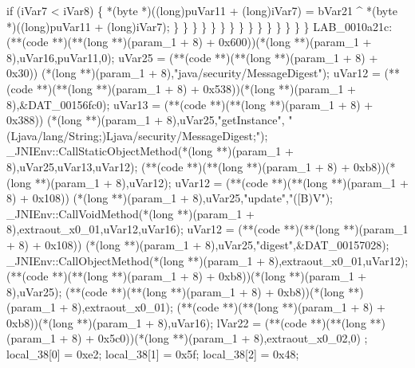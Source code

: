 \documentclass[
]{article}
\newenvironment{Shaded}{}{}
\newcommand{\NormalTok}[1]{#1}
\begin{document}
\begin{Shaded}
\begin{Highlighting}[]
\NormalTok{                              if (iVar7 \textless{} iVar8) \{}
\NormalTok{                                *(byte *)((long)puVar11 + (long)iVar7) =}
\NormalTok{                                     bVar21 \^{} *(byte *)((long)puVar11 + (long)iVar7);}
\NormalTok{                              \}}
\NormalTok{                            \}}
\NormalTok{                          \}}
\NormalTok{                        \}}
\NormalTok{                      \}}
\NormalTok{                    \}}
\NormalTok{                  \}}
\NormalTok{                \}}
\NormalTok{              \}}
\NormalTok{            \}}
\NormalTok{          \}}
\NormalTok{        \}}
\NormalTok{      \}}
\NormalTok{    \}}
\NormalTok{  \}}
\NormalTok{LAB\_0010a21c:}
\NormalTok{  (**(code **)(**(long **)(param\_1 + 8) + 0x600))(*(long **)(param\_1 + 8),uVar16,puVar11,0);}
\NormalTok{  uVar25 = (**(code **)(**(long **)(param\_1 + 8) + 0x30))}
\NormalTok{                     (*(long **)(param\_1 + 8),"java/security/MessageDigest");}
\NormalTok{  uVar12 = (**(code **)(**(long **)(param\_1 + 8) + 0x538))(*(long **)(param\_1 + 8),\&DAT\_00156fc0);}
\NormalTok{  uVar13 = (**(code **)(**(long **)(param\_1 + 8) + 0x388))}
\NormalTok{                     (*(long **)(param\_1 + 8),uVar25,"getInstance",}
\NormalTok{                      "(Ljava/lang/String;)Ljava/security/MessageDigest;");}
\NormalTok{  \_JNIEnv::CallStaticObjectMethod(*(long **)(param\_1 + 8),uVar25,uVar13,uVar12);}
\NormalTok{  (**(code **)(**(long **)(param\_1 + 8) + 0xb8))(*(long **)(param\_1 + 8),uVar12);}
\NormalTok{  uVar12 = (**(code **)(**(long **)(param\_1 + 8) + 0x108))}
\NormalTok{                     (*(long **)(param\_1 + 8),uVar25,"update","([B)V");}
\NormalTok{  \_JNIEnv::CallVoidMethod(*(long **)(param\_1 + 8),extraout\_x0\_01,uVar12,uVar16);}
\NormalTok{  uVar12 = (**(code **)(**(long **)(param\_1 + 8) + 0x108))}
\NormalTok{                     (*(long **)(param\_1 + 8),uVar25,"digest",\&DAT\_00157028);}
\NormalTok{  \_JNIEnv::CallObjectMethod(*(long **)(param\_1 + 8),extraout\_x0\_01,uVar12);}
\NormalTok{  (**(code **)(**(long **)(param\_1 + 8) + 0xb8))(*(long **)(param\_1 + 8),uVar25);}
\NormalTok{  (**(code **)(**(long **)(param\_1 + 8) + 0xb8))(*(long **)(param\_1 + 8),extraout\_x0\_01);}
\NormalTok{  (**(code **)(**(long **)(param\_1 + 8) + 0xb8))(*(long **)(param\_1 + 8),uVar16);}
\NormalTok{  lVar22 = (**(code **)(**(long **)(param\_1 + 8) + 0x5c0))(*(long **)(param\_1 + 8),extraout\_x0\_02,0)}
\NormalTok{  ;}
\NormalTok{  local\_38[0] = 0xe2;}
\NormalTok{  local\_38[1] = 0x5f;}
\NormalTok{  local\_38[2] = 0x48;}

\end{Highlighting}
\end{Shaded}
\end{document}
